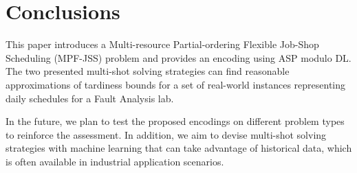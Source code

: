 \documentclass[submission,copyright,creativecommons]{eptcs}
\newcommand{\jss}{MPF-JSS\xspace}
\begin{document}
\section{Conclusions}
This paper introduces a Multi-resource Partial-ordering Flexible Job-Shop Scheduling (\jss) problem and provides an encoding using ASP modulo DL. The two presented multi-shot solving strategies can find reasonable approximations of tardiness bounds for a set of real-world instances representing daily schedules for a Fault Analysis lab. %

In the future, we plan to test the proposed encodings on different problem types to reinforce the assessment. In addition, we aim to devise multi-shot solving strategies with machine learning that can take advantage of historical data, which is often available in industrial application scenarios. 



\end{document}
